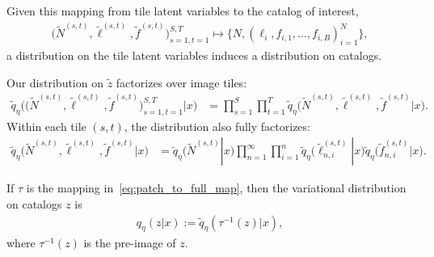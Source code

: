 Given this mapping from tile latent variables to the catalog of interest, 
\begin{align}
 \big(\tilde N^{(s, t)}, \tilde \ell^{(s, t)}, \tilde f^{(s, t)}\big)_{s=1, t = 1}^{S, T}
\mapsto     
\{N, (\ell_i, f_{i,1}, ..., f_{i,B})_{i = 1}^N\},
\label{eq:patch_to_full_map}
\end{align}
a distribution on the tile latent variables induces a distribution on catalogs. 

Our distribution on $\tilde z$ factorizes over image tiles:
\begin{align}
    \tilde q_\eta\big( \big(\tilde N^{(s, t)}, \tilde \ell^{(s, t)}, \tilde f^{(s, t)}\big)_{s=1, t = 1}^{S, T}|x\big) 
    &=
    \prod_{s = 1}^S \prod_{t=1}^T
    \tilde q_\eta\big(\tilde N^{(s, t)}, \tilde \ell^{(s, t)}, \tilde f^{(s, t)} | x\big).
    \label{eq:factorize_patches}
\end{align}
Within each tile $(s,t)$, the distribution also fully factorizes: 
\begin{align}
    \tilde q_\eta\big(\tilde N^{(s, t)}, \tilde \ell^{(s, t)}, \tilde f^{(s, t)} | x\big)
    &= 
    \tilde q_\eta\big(\tilde N^{(s, t)} | x\big)
    \prod_{n = 1}^\infty \prod_{i = 1}^n 
    \tilde q_\eta\big(\tilde \ell_{n,i}^{(s, t)} | x\big)
    \tilde q_\eta\big(\tilde f_{n,i}^{(s, t)} | x\big).
    \label{eq:factorize_within_patch}
\end{align}

If $\tau$ is the mapping in~\eqref{eq:patch_to_full_map}, then the variational distribution on catalogs $z$ is
\begin{align}
    q_\eta(z | x) := \tilde q_\eta(\tau^{-1}(z) | x),
    \label{eq:pull_back_of_q}
\end{align}
where $\tau^{-1}(z)$ is the pre-image of $z$.



